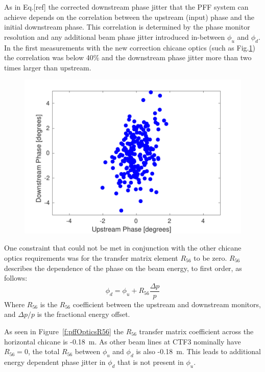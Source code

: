 \documentclass[%
 reprint,
 superscriptaddress,
 amsmath,
 amssymb,
 prstab,
]{revtex4-1}
\begin{document}
As in Eq.[ref] the corrected downstream phase jitter that the PFF system can 
achieve depends on the correlation between the upstream (input) phase and the 
initial downstream phase. This correlation is determined by the phase monitor 
resolution and any additional beam phase jitter introduced in-between 
\(\phi_u\) and \(\phi_d\). In the first measurements with the new correction 
chicane optics (such as Fig.\ref{f:origUpVsDown}) the correlation was below 
40\% and the downstream phase jitter more than two times larger than upstream. 

\begin{figure}
	\includegraphics[width=\columnwidth]{figs/prop/origUpVsDown}%
	\caption{\label{f:origUpVsDown}
	}
\end{figure}

One constraint that could not be met in conjunction with the other chicane 
optics requirements was for the transfer matrix element \(R_{56}\) to be zero. 
\(R_{56}\) describes the dependence of the phase on the beam energy, to first 
order, as 
follows: 
\begin{equation}
\phi_d = \phi_u + R_{56}\frac{\Delta p}{p}
\label{e:r56PhasEq}
\end{equation}
Where \(R_{56}\) is the \(R_{56}\) coefficient between the upstream and 
downstream monitors, and \(\Delta p/p\) is the fractional energy offset.

As seen in Figure~\ref{f:pffOpticsR56} the \(R_{56}\) transfer matrix 
coefficient across the horizontal chicane is -0.18~m. As other beam lines at 
CTF3 nominally have \(R_{56}=0\), the total \(R_{56}\) between \(\phi_u\) and 
\(\phi_d\) is also -0.18~m. This leads to additional energy dependent phase 
jitter in \(\phi_d\) that is not present in \(\phi_u\).
\end{document}
